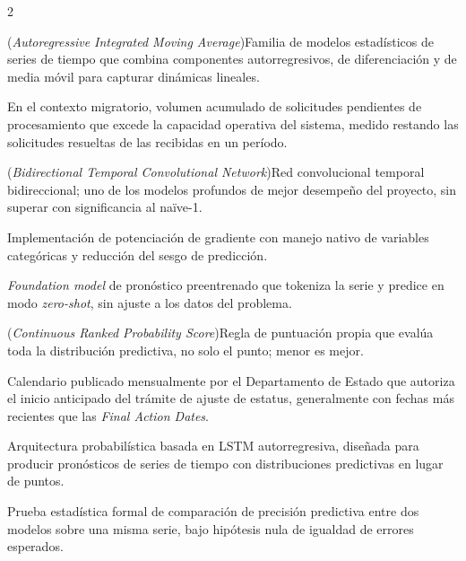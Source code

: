 \documentclass[12pt,letterpaper]{report}
\begin{document}
\begin{multicols}{2}
\begin{description}[leftmargin=0pt, labelindent=0pt, itemindent=0pt,
                    labelsep=0.4em, font=\bfseries\scriptsize,
                    itemsep=1pt, parsep=0pt, topsep=0pt]
    \item[ARIMA] (\textit{Autoregressive Integrated Moving Average})\hspace{0.3em}Familia de modelos estadísticos de series de tiempo que combina componentes autorregresivos, de diferenciación y de media móvil para capturar dinámicas lineales.

    \item[Backlog (neto)] En el contexto migratorio, volumen acumulado de solicitudes pendientes de procesamiento que excede la capacidad operativa del sistema, medido restando las solicitudes resueltas de las recibidas en un período.

    \item[BiTCN] (\textit{Bidirectional Temporal Convolutional Network})\hspace{0.3em}Red convolucional temporal bidireccional; uno de los modelos profundos de mejor desempeño del proyecto, sin superar con significancia al naïve-1.

    \item[CatBoost] Implementación de potenciación de gradiente con manejo nativo de variables categóricas y reducción del sesgo de predicción.

    \item[Chronos] \textit{Foundation model} de pronóstico preentrenado que tokeniza la serie y predice en modo \textit{zero-shot}, sin ajuste a los datos del problema.

    \item[CRPS] (\textit{Continuous Ranked Probability Score})\hspace{0.3em}Regla de puntuación propia que evalúa toda la distribución predictiva, no solo el punto; menor es mejor.

    \item[Dates for Filing] Calendario publicado mensualmente por el Departamento de Estado que autoriza el inicio anticipado del trámite de ajuste de estatus, generalmente con fechas más recientes que las \textit{Final Action Dates}.

    \item[DeepAR] Arquitectura probabilística basada en LSTM autorregresiva, diseñada para producir pronósticos de series de tiempo con distribuciones predictivas en lugar de puntos.

    \item[Diebold-Mariano (prueba)] Prueba estadística formal de comparación de precisión predictiva entre dos modelos sobre una misma serie, bajo hipótesis nula de igualdad de errores esperados.


\end{description}
\end{multicols}
\end{document}
